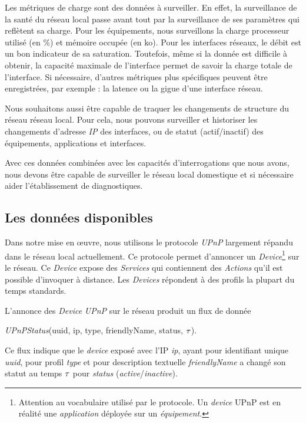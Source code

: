 Les métriques de charge sont des données à surveiller. En effet, la surveillance de la santé du réseau local passe avant tout par la surveillance de ses paramètres qui reflètent sa charge. Pour les équipements, nous surveillons la charge processeur utilisé (en \%) et mémoire occupée (en ko). Pour les interfaces réseaux, le débit est un bon indicateur de sa saturation. Toutefois, même si la donnée est difficile à obtenir, la capacité maximale de l'interface permet de savoir la charge totale de l'interface. Si nécessaire, d'autres métriques plus spécifiques peuvent être enregistrées, par exemple : la latence ou la gigue d'une interface réseau.

Nous souhaitons aussi être capable de traquer les changements de structure du réseau réseau local. Pour cela, nous pouvons surveiller et historiser les changements d'adresse \textit{IP} des interfaces, ou de statut (actif/inactif) des équipements, applications et interfaces.

Avec ces données combinées avec les capacités d'interrogations que nous avons, nous devons être capable de surveiller le réseau local domestique et si nécessaire aider l'établissement de diagnostiques.

\subsection{Les données disponibles}
Dans notre mise en œuvre, nous utilisons le protocole \textit{UPnP} largement répandu dans le réseau local actuellement. Ce protocole permet d'annoncer un \textit{Device}\footnote{Attention au vocabulaire utilisé par le protocole. Un \textit{device} UPnP est en réalité une \textit{application} déployée sur un \textit{équipement}.} sur le réseau. Ce \textit{Device} expose des \textit{Services} qui contiennent des \textit{Actions} qu'il est possible d'invoquer à distance. Les \textit{Devices} répondent à des profils la plupart du temps standards.

L'annonce des \textit{Device} \textit{UPnP} sur le réseau produit un flux de donnée \begin{center}\textit{UPnPStatus}(uuid, ip, type, friendlyName, status, $\tau$).\end{center} Ce flux indique que le \textit{device} exposé avec l'IP \textit{ip}, ayant pour identifiant unique \textit{uuid}, pour profil \textit{type} et pour description textuelle \textit{friendlyName} a changé son statut au temps $\tau$ pour \textit{status} (\textit{active}/\textit{inactive}).

